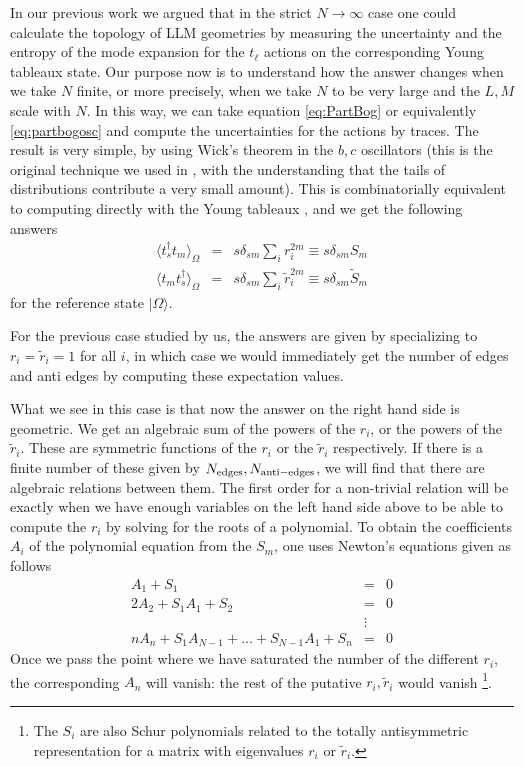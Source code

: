\documentclass[12pt,nofootinbib, longbibliography]{revtex4-1}
\newcommand\vev[1]{\langle #1\rangle}
\newcommand\ket[1]{| #1\rangle}
\begin{document}
In our previous work we argued that in the strict $N\to \infty$ case one could calculate the  topology of LLM geometries by measuring the uncertainty and the entropy of the mode expansion for the $t_\ell$ actions on the corresponding Young tableaux state. Our purpose now is to understand how the answer changes when we take $N$ finite, or more precisely, when we take $N$ to be very large and the $L,M$ scale with $N$. In this way, we can take equation \eqref{eq:PartBog} or equivalently \eqref{eq:partbogosc} and compute the uncertainties for the actions by traces.
The result is very simple, by using Wick's theorem in the $b,c$ oscillators (this is the original technique  we used in \cite{Berenstein:2016pcx}, with the understanding that the tails of distributions contribute a very small amount). This is combinatorially equivalent to computing directly with the Young tableaux \cite{Berenstein:2017abm, Lin:2017dnz}, and  we get the following answers
\begin{eqnarray}
\vev{t^\dagger_s t_m}_{\Omega}&=& s \delta _{sm} \sum_i r_i^{2m} \equiv s \delta_{sm} S_m\\
\vev{t_m t_s^\dagger}_{\Omega}&=&s \delta _{sm} \sum_i \tilde r_i^{2m}\equiv s \delta_{sm} \tilde S_m
\end{eqnarray}
for the reference state $\ket \Omega$. 

For the previous case studied by us, the answers are given by specializing to $r_i=\tilde r_i=1$ for all $i$, in which case we would immediately get the number of edges and anti edges
by computing these expectation values. 

What we see in this case is that now the answer on the right hand side is geometric. We get  an algebraic sum of the powers of the $r_i$, or the powers of the $\tilde r_i$.
These are symmetric functions of the $r_i$ or the $\tilde r_i$ respectively.
If there is a finite number of these given by $N_{\rm{edges}},N_{\rm{anti-edges}}$,  we will find that there are algebraic relations between them. The first order for a non-trivial relation will be exactly when we have enough variables on the left hand side above to be able to compute the $r_i$ by solving for the roots of  a polynomial. To obtain the coefficients $A_i$ of the polynomial equation from the $S_m$, one uses Newton's equations given as follows
\begin{eqnarray}
A_1+S_1&=&0\\
2A_2+S_1 A_1+S_2&=&0\\
&\vdots &
\\
n A_n +S_1 A_{N-1}+\dots + S_{N-1} A_1+S_n&=&0
\end{eqnarray}
Once we pass the point where we have saturated the number of the different $r_i$, the corresponding $A_n$ will vanish: the rest of the putative $r_i,\tilde r_i$ would vanish \footnote{The $S_i$ are also Schur polynomials related to the totally antisymmetric representation for a matrix with eigenvalues $r_i$ or $\tilde r_i$.}.
\end{document}
